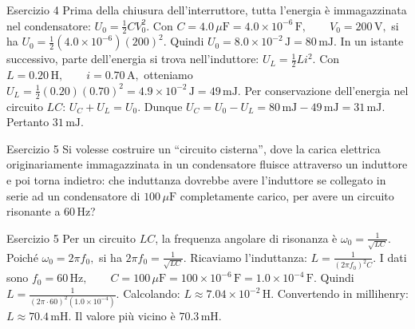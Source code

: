\documentclass[a4paper]{article}
\begin{document}
\begin{snippetsolution}{Esercizio 4}
    Prima della chiusura dell'interruttore, tutta l'energia è immagazzinata nel
    condensatore:
    \(U_0 = \frac{1}{2}CV_0^2.\)
    Con
    \(C = 4.0\,\mu\mathrm{F} = 4.0 \times 10^{-6}\,\mathrm{F}, \qquad V_0 = 200\,\mathrm{V},\)
    si ha
    \(U_0 = \frac{1}{2} \left(4.0 \times 10^{-6}\right) (200)^2.\)
    Quindi
    \(U_0 = 8.0 \times 10^{-2}\,\mathrm{J} = 80\,\mathrm{mJ}.\)
    In un istante successivo, parte dell'energia si trova nell'induttore:
    \(U_L = \frac{1}{2}Li^2.\)
    Con
    \(L = 0.20\,\mathrm{H}, \qquad i = 0.70\,\mathrm{A},\)
    otteniamo
    \(U_L = \frac{1}{2} (0.20) (0.70)^2 = 4.9 \times 10^{-2}\,\mathrm{J} = 49\,\mathrm{mJ}.\)
    Per conservazione dell'energia nel circuito \(LC\):
    \(U_C + U_L = U_0.\)
    Dunque
    \(U_C = U_0 - U_L = 80\,\mathrm{mJ} - 49\,\mathrm{mJ} = 31\,\mathrm{mJ}.\)
    Pertanto
    \(\boxed{31\,\mathrm{mJ}}.\)
\end{snippetsolution}
\begin{snippetexercise}{Esercizio 5}
    Si volesse costruire un ``circuito cisterna'', dove la carica elettrica
    originariamente immagazzinata in un condensatore fluisce attraverso un
    induttore e poi torna indietro: che induttanza dovrebbe avere l'induttore se
    collegato in serie ad un condensatore di \(100\,\mu\mathrm{F}\)
    completamente carico, per avere un circuito risonante a \(60\,\mathrm{Hz}\)?

\end{snippetexercise}
\begin{snippetsolution}{Esercizio 5}
    Per un circuito \(LC\), la frequenza angolare di risonanza è
    \(\omega_0 = \frac{1}{\sqrt{LC}}.\)
    Poiché
    \(\omega_0 = 2\pi f_0,\)
    si ha
    \(2\pi f_0 = \frac{1}{\sqrt{LC}}.\)
    Ricaviamo l'induttanza:
    \(L = \frac{1}{(2\pi f_0)^2 C}.\)
    I dati sono
    \(f_0 = 60\,\mathrm{Hz}, \qquad C = 100\,\mu\mathrm{F} = 100 \times 10^{-6}\,\mathrm{F} = 1.0 \times 10^{-4}\,\mathrm{F}.\)
    Quindi
    \(L = \frac{1} { \left(2\pi \cdot 60\right)^2 \left(1.0 \times 10^{-4}\right) }.\)
    Calcolando:
    \(L \approx 7.04 \times 10^{-2}\,\mathrm{H}.\)
    Convertendo in millihenry:
    \(L \approx 70.4\,\mathrm{mH}.\)
    Il valore più vicino è
    \(\boxed{70.3\,\mathrm{mH}}.\)
\end{snippetsolution}
\pagebreak
\end{document}

